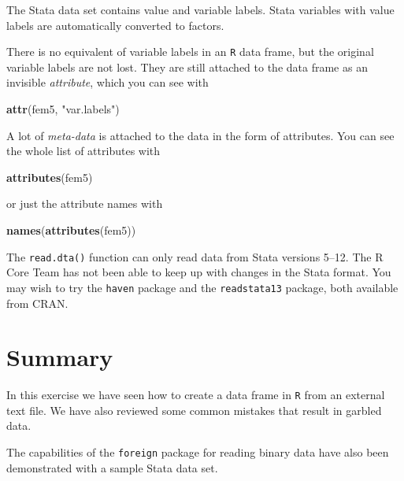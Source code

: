 \documentclass[
]{book}
\newenvironment{Shaded}{\begin{snugshade}}{\end{snugshade}}
\newcommand{\FunctionTok}[1]{\textcolor[rgb]{0.13,0.29,0.53}{\textbf{#1}}}
\newcommand{\NormalTok}[1]{#1}
\newcommand{\StringTok}[1]{\textcolor[rgb]{0.31,0.60,0.02}{#1}}
\begin{document}
The Stata data set contains value and variable labels.
Stata variables with value labels are automatically converted to
factors.

There is no equivalent of variable labels in an \texttt{R} data frame,
but the original variable labels are not lost. They are still attached
to the data frame as an invisible \emph{attribute}, which you can see
with

\begin{Shaded}
\begin{Highlighting}[]
\FunctionTok{attr}\NormalTok{(fem5, }\StringTok{"var.labels"}\NormalTok{)}
\end{Highlighting}
\end{Shaded}

A lot of \emph{meta-data} is attached to the data in the form of
attributes. You can see the whole list of attributes with

\begin{Shaded}
\begin{Highlighting}[]
\FunctionTok{attributes}\NormalTok{(fem5)}
\end{Highlighting}
\end{Shaded}

or just the attribute names with

\begin{Shaded}
\begin{Highlighting}[]
\FunctionTok{names}\NormalTok{(}\FunctionTok{attributes}\NormalTok{(fem5))}
\end{Highlighting}
\end{Shaded}

The \texttt{read.dta()} function can only read data from Stata
versions 5--12. The R Core Team has not been able to keep up with
changes in the Stata format. You may wish to try the \texttt{haven}
package and the \texttt{readstata13} package, both available from
CRAN.

\section{Summary}\label{summary}

In this exercise we have seen how to create a data frame in \texttt{R}
from an external text file. We have also reviewed some common mistakes
that result in garbled data.

The capabilities of the \texttt{foreign} package for reading binary
data have also been demonstrated with a sample Stata data set.
\end{document}
